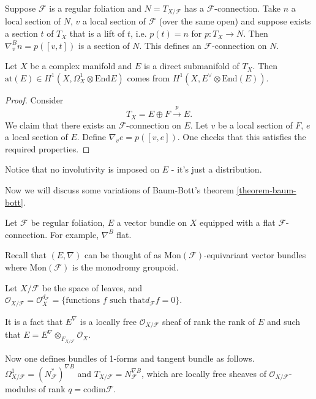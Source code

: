 \begin{example}
\label{example-bott-partial-connection}
Suppose $\mathcal{F}$ is a regular foliation
and $N=T_{X/\mathcal{F}}$ has a
$\mathcal{F}$-connection.
Take $n$ a local section of $N$,  $v$ a local
section of $\mathcal{F}$
(over the same open) and suppose exists a
section $t$ of $T_X$
that is a lift of $t$, i.e. $p(t)=n$ for
$p:T_X \to N$.
Then $\nabla_v^Bn=p([v,t])$ is a section of
$N$.
This defines an $\mathcal{F}$-connection on
$N$.
\end{example}

\begin{lemma}[Beauville]
\label{lemma-beauville}
Let $X$ be a complex manifold and $E$ is a
direct submanifold of $T_X$.
Then $\text{at}(E) \in H^1(X,\Omega_X^1
\otimes \text{End}E)$
comes from $H^1(X,E^\vee \otimes
\text{End}(E))$.
\end{lemma}

\begin{proof}
Consider
$$
T_X= E \oplus F \xrightarrow{p}E.
$$
We claim that there exists an
$\mathcal{F}$-connection on $E$.
Let $v$ be a local section of $F$,
$e$ a local section of $E$.
Define $\nabla_ve=p([v,e])$.
One checks that this satisfies the required
properties.
\end{proof}

\noindent
Notice that no involutivity is imposed on $E$
- it's just a distribution.

\medskip\noindent
Now we will discuss some variations of
Baum-Bott's theorem
\ref{theorem-baum-bott}.

Let $\mathcal{F}$ be  regular foliation, $E$
a vector bundle on $X$ equipped with a flat
$\mathcal{F}$-connection.
For example, $\nabla^B$ flat.

Recall that  $(E,\nabla)$ can be thought of
as
$\text{Mon}(\mathcal{F})$-equivariant vector
bundles
where $\text{Mon}(\mathcal{F})$ is the
monodromy groupoid.

Let $X/\mathcal{F}$ be the space of leaves,
and
$\mathcal{O}_{X/\mathcal{F}}=\mathcal{O}
_X^{d_{\mathcal{F}}}=
\{\text{functions $f$ such that
$d_{\mathcal{F}}f=0$}\}$.

It is a fact that $E^{\nabla}$ is a locally
free $\mathcal{O}_{X/\mathcal{F}}$
sheaf of rank the rank of $E$ and such that
$E=E^{\nabla}\otimes_{F_{X/\mathcal{F}}}
\mathcal{O}_X$.

Now one defines bundles of 1-forms and
tangent bundle as follows.
 $\Omega_{X/\mathcal{F}}^1=(N_{\mathcal{F}}^*
 )^{\nabla B}$
and
$T_{X/\mathcal{F}}=N_{\mathcal{F}}^{\nabla
B}$,
which are locally free sheaves of
$\mathcal{O}_{X/\mathcal{F}}$-modules
of rank $q=\text{codim}\mathcal{F}$.

